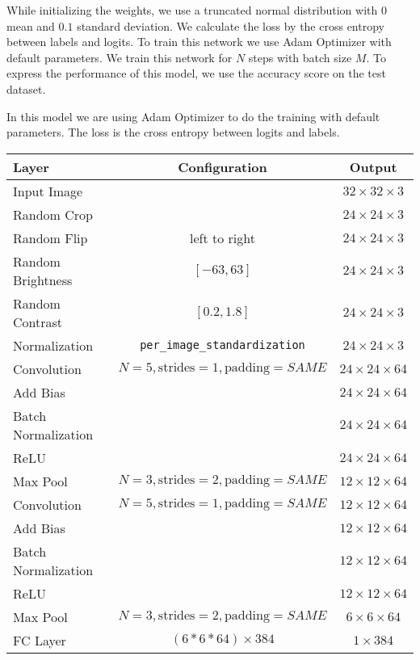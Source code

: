 While initializing the weights, we use a truncated normal distribution with $0$ mean and $0.1$ standard deviation. We calculate the loss by the cross entropy between labels and logits. To train this network we use Adam Optimizer with default parameters. We train this network for $N$ steps with batch size $M$.  To express the performance of this model, we use the accuracy score on the test dataset.

In this model we are using Adam Optimizer to do the training with default parameters. The loss is the cross entropy between logits and labels.
\begin{table}
\centering
\begin{tabular}{l | c | c}
Layer & Configuration & Output\\
\hline
Input Image & & $32 \times 32 \times 3$ \\
\hline
Random Crop & & $24 \times 24 \times 3$ \\
Random Flip & left to right & $24 \times 24 \times 3$ \\
Random Brightness &  $[-63, 63]$  & $24 \times 24 \times 3$ \\
Random Contrast &  $[0.2, 1.8]$  & $24 \times 24 \times 3$ \\
Normalization &  \texttt{per\_image\_standardization}  & $24 \times 24 \times 3$ \\
\hline
Convolution & \small $N=5, \text{strides}=1, \text{padding}=SAME$ & $24 \times 24 \times 64$ \\
Add Bias & & $24 \times 24 \times 64$ \\
Batch Normalization & & $24 \times 24 \times 64$ \\
ReLU & & $24 \times 24 \times 64$ \\
Max Pool & \small $N=3, \text{strides}=2, \text{padding}=SAME$ & $12 \times 12 \times 64$ \\
\hline
Convolution & \small $N=5, \text{strides}=1, \text{padding}=SAME$ & $12 \times 12 \times 64$ \\
Add Bias & & $12 \times 12 \times 64$ \\
Batch Normalization & & $12 \times 12 \times 64$ \\
ReLU & & $12 \times 12 \times 64$ \\
Max Pool & \small $N=3, \text{strides}=2, \text{padding}=SAME$ & $6 \times 6 \times 64$ \\
\hline
FC Layer &  \small $(6*6*64) \times 384 $ & $1 \times 384$ \\

\end{tabular}
\end{table}

